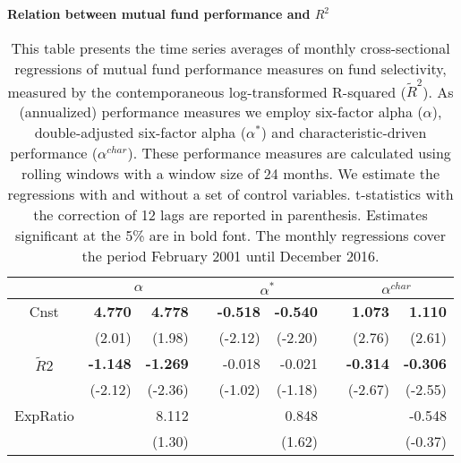 \newpage
\begin{singlespacing}
\begin{table}[H]
\centering
\small
\setlength{\tabcolsep}{11pt}
{\captionsetup{justification=centering,singlelinecheck=off}
\caption{ \bfseries Relation between mutual fund performance and $R^2$}  \label{table7} }
\caption*{This table presents the time series averages of monthly cross-sectional regressions of mutual fund performance measures on fund selectivity, measured by the contemporaneous log-transformed R-squared ($\tilde{R}^2$). As (annualized) performance measures we employ six-factor alpha ($\alpha$), double-adjusted six-factor alpha ($\alpha^*$) and characteristic-driven performance ($\alpha^{char}$). These performance measures are calculated using rolling windows with a window size of 24 months. We estimate the regressions with and without a set of control variables. \citet{fama1973risk} t-statistics with the \citet{newey1986simple} correction of 12 lags are reported in parenthesis. Estimates significant at the 5\% are in bold font. The monthly regressions cover the period February 2001 until December 2016. }
\label{my-label}
\begin{tabular}{crrrrrrrr}
\hline
            & \multicolumn{2}{c}{$\alpha$} & &  \multicolumn{2}{c}{$\alpha^*$} &  & \multicolumn{2}{c}{$\alpha^{char}$} \\ \hline
Cnst        & \textbf{4.770}           & \textbf{4.778}           &  & \textbf{-0.518}           & \textbf{-0.540}          &  & \textbf{1.073}            & \textbf{1.110}            \\
            & (2.01)          & (1.98)          &  & (-2.12)                   & (-2.20)                  &  & (2.76)                    & (2.61)                    \\
$\tilde{R}2$         & \textbf{-1.148} & \textbf{-1.269} &  & -0.018                    & -0.021                   &  & \textbf{-0.314}           & \textbf{-0.306}           \\
            & (-2.12)         & (-2.36)         &  & (-1.02)                   & (-1.18)                  &  & (-2.67)                   & (-2.55)                   \\
ExpRatio    &                 & 8.112           &  &                           & 0.848                    &  &                           & -0.548                    \\
            &                 & (1.30)          &  &                           & (1.62)                   &  &                           & (-0.37)                   \\

\end{tabular}
\end{table}
\end{singlespacing}
